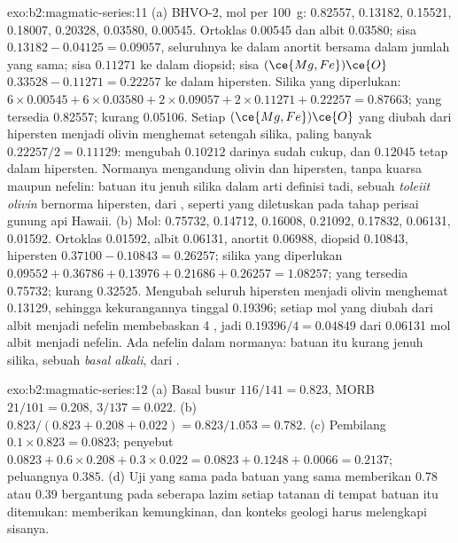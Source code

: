 \begin{solution}{exo:b2:magmatic-series:11}
(a) BHVO-2, mol per \qty{100}{g}:  0.82557,  0.13182, 
0.15521,  0.18007,  0.20328,  0.03580,  0.00545.
Ortoklas 0.00545 dan albit 0.03580; sisa  $0.13182 - 0.04125 = 0.09057$,
seluruhnya ke dalam anortit bersama  dalam jumlah yang sama; sisa  $0.11271$ ke dalam diopsid;
sisa $(\ce{Mg,Fe})\ce{O}$ $0.33528 - 0.11271 = 0.22257$ ke dalam hipersten. Silika
yang diperlukan: $6\times0.00545 + 6\times0.03580 + 2\times0.09057 + 2\times0.11271 + 0.22257 =
0.87663$; yang tersedia 0.82557; kurang 0.05106. Setiap $(\ce{Mg,Fe})\ce{O}$ yang diubah dari
hipersten menjadi olivin menghemat setengah silika, paling banyak $0.22257/2 = 0.11129$: mengubah
$0.10212$ darinya sudah cukup, dan $0.12045$ tetap dalam hipersten. Normanya mengandung olivin
dan hipersten, tanpa kuarsa maupun nefelin: batuan itu jenuh silika dalam
arti definisi tadi, sebuah \emph{toleiit olivin} bernorma hipersten, dari
, seperti yang diletuskan pada tahap perisai gunung api Hawaii. (b) Mol: 0.75732, 0.14712, 0.16008, 0.21092, 0.17832, 0.06131,
0.01592. Ortoklas 0.01592, albit 0.06131, anortit 0.06988, diopsid 0.10843, hipersten $0.37100 - 0.10843 =
0.26257$; silika yang diperlukan $0.09552 + 0.36786 + 0.13976 + 0.21686 + 0.26257 = 1.08257$;
yang tersedia 0.75732; kurang 0.32525. Mengubah seluruh hipersten menjadi olivin menghemat
0.13129, sehingga kekurangannya tinggal 0.19396; setiap mol  yang diubah dari albit menjadi nefelin
membebaskan 4 , jadi $0.19396/4 = 0.04849$
dari 0.06131 mol  albit menjadi nefelin. Ada nefelin dalam normanya: batuan itu
kurang jenuh silika, sebuah \emph{basal alkali}, dari .
\end{solution}

\begin{solution}{exo:b2:magmatic-series:12}
(a) Basal busur $116/141 = 0.823$, MORB $21/101 = 0.208$, 
$3/137 = 0.022$. (b) $0.823/(0.823 + 0.208 + 0.022) = 0.823/1.053 = 0.782$.
(c) Pembilang $0.1\times0.823 = 0.0823$; penyebut $0.0823 + 0.6\times0.208 +
0.3\times0.022 = 0.0823 + 0.1248 + 0.0066 = 0.2137$; peluangnya $0.385$. (d) Uji
yang sama pada batuan yang sama memberikan 0.78 atau 0.39 bergantung pada seberapa lazim setiap tatanan
di tempat batuan itu ditemukan:  memberikan kemungkinan, dan
konteks geologi harus melengkapi sisanya.
\end{solution}

